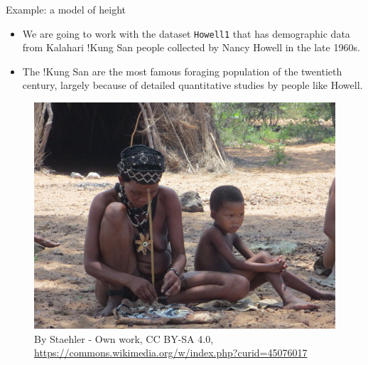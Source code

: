 \documentclass[handout]{beamer}
\begin{document}
\begin{frame}[fragile]{Example: a model of height}
\scriptsize{
\begin{itemize}
 \item  We are going to work with the dataset \verb+Howell1+ that has demographic data from Kalahari !Kung San people collected by Nancy Howell in the late 1960s. 
 \item The !Kung San are the most famous foraging population of the twentieth century, largely because of detailed quantitative studies by people like Howell. \cite{mcelreath2020statistical}
 \end{itemize} 

 
 \begin{figure}[h!]
  \centering
  \includegraphics[scale=0.6]{pics/San_Schmuck.jpg}
  \caption{By Staehler - Own work, CC BY-SA 4.0, \url{https://commons.wikimedia.org/w/index.php?curid=45076017}}
\end{figure}

 
}
\end{frame}
\end{document}
